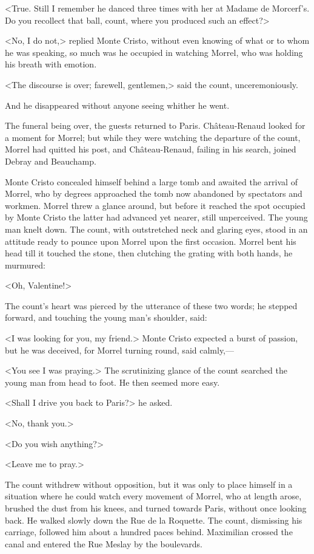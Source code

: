  <True. Still I remember he danced three times with her at Madame de Morcerf's. Do you recollect that ball, count, where you produced such an effect?>

<No, I do not,> replied Monte Cristo, without even knowing of what or to whom he was speaking, so much was he occupied in watching Morrel, who was holding his breath with emotion. 

 <The discourse is over; farewell, gentlemen,> said the count, unceremoniously. 

 And he disappeared without anyone seeing whither he went. 

 The funeral being over, the guests returned to Paris. Château-Renaud looked for a moment for Morrel; but while they were watching the departure of the count, Morrel had quitted his post, and Château-Renaud, failing in his search, joined Debray and Beauchamp. 

 Monte Cristo concealed himself behind a large tomb and awaited the arrival of Morrel, who by degrees approached the tomb now abandoned by spectators and workmen. Morrel threw a glance around, but before it reached the spot occupied by Monte Cristo the latter had advanced yet nearer, still unperceived. The young man knelt down. The count, with outstretched neck and glaring eyes, stood in an attitude ready to pounce upon Morrel upon the first occasion. Morrel bent his head till it touched the stone, then clutching the grating with both hands, he murmured: 

 <Oh, Valentine!> 

 The count's heart was pierced by the utterance of these two words; he stepped forward, and touching the young man's shoulder, said: 

 <I was looking for you, my friend.> Monte Cristo expected a burst of passion, but he was deceived, for Morrel turning round, said calmly,— 

 <You see I was praying.> The scrutinizing glance of the count searched the young man from head to foot. He then seemed more easy. 

 <Shall I drive you back to Paris?> he asked. 

 <No, thank you.> 

 <Do you wish anything?> 

 <Leave me to pray.> 

 The count withdrew without opposition, but it was only to place himself in a situation where he could watch every movement of Morrel, who at length arose, brushed the dust from his knees, and turned towards Paris, without once looking back. He walked slowly down the Rue de la Roquette. The count, dismissing his carriage, followed him about a hundred paces behind. Maximilian crossed the canal and entered the Rue Meslay by the boulevards. 

